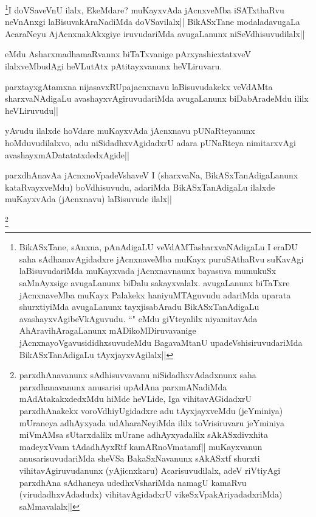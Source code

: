 \begin{artha}
\footnote{BikASxTane, sAnxna, pAnAdigaLU veVdAMTasharxvaNAdigaLu I eraDU saha sAdhanavAgidadxre jAcnxnaveMba muKayx puruSAthaRvu suKavAgi laBisuvudariMda muKayxvada jAcnxnavnaunx bayasuva mumukuSx saMnAyxsige avugaLanunx biDalu sakayxvalalx. avugaLanunx biTaTxre jAcnxnaveMba muKayx Palakekx haniyuMTAguvudu adariMda uparata shurxtiyiMda avugaLanunx tayxjisabAradu BikASxTanAdigaLu avashayxvAgibeVkAguvudu. ``\stext" eMdu giVteyalilx niyamitavAda AhAravihAragaLanunx mADikoMDiruvavanige jAcnxnayoVgavusididhxsuvudeMdu BagavaMtanU upadeVshisiruvudariMda BikASxTanAdigaLu tAyxjayxvAgilalx||}I doVSaveVnU ilalx, EkeMdare? muKayxvAda jAcnxveMba iSATxthaRvu neVnAnxgi laBisuvakAraNadiMda doVSavilalx|| BikASxTane modaladavugaLa AcaraNeyu AjAcnxnakAkxgiye iruvudariMda avugaLanunx niSeVdhisuvudilalx||
\end{artha}

\begin{artha}
eMdu AsharxmadhamaRvannx biTaTxvanige pArxyashicxtatxveV ilalxveMbudAgi heVLutAtx pAtitayxvanunx heVLiruvaru.
\end{artha}

\begin{artha}
parxtayxgAtamxna nijasavxRUpajacnxnavu laBisuvudakekx veVdAMta sharxvaNAdigaLu avashayxvAgiruvudariMda avugaLanunx biDabAradeMdu ililx heVLiruvudu||
\end{artha}


\begin{artha}
yAvudu ilalxde hoVdare muKayxvAda jAcnxnavu pUNaRteyanunx hoMduvudilalxvo, adu niSidadhxvAgidadxrU adara pUNaRteya nimitarxvAgi avashayxmADatatatxdedxAgide||
\end{artha}


\begin{artha}
parxdhAnavAa jAcnxnoVpadeVshaveV I (sharxvaNa, BikASxTanAdigaLanunx kataRvayxveMdu) boVdhisuvudu, adariMda BikASxTanAdigaLu  ilalxde muKayxvAda (jAcnxnavu) laBisuvude ilalx||
\end{artha}

\begin{artha}
\footnote{parxdhAnavanunx sAdhisuvvavanu niSidadhxvAdadxnunx saha parxdhanavanunx anusarisi upAdAna parxmANadiMda mAdAtakakxdedxMdu hiMde heVLide, Iga vihitavAGidadxrU parxdhAnakekx voroVdhiyUgidadxre adu tAyxjayxveMdu (jeYminiya) mUraneya adhAyxyada udAharaNeyiMda ililx toVrisiruvaru jeYminiya miVmAMsa sUtarxdalilx mUrane adhAyxyadalilx sAkASxdivxhita madeyxVvam tAdadhAyxRtf kamARnoVmatamf|| muKayxvanun anusarisuvudariMda sheVSa BakaSxNavanunx sAkASxtf shurxti vihitavAgiruvudanunx (yAjicnxkaru) Acarisuvudilalx, adeV riVtiyAgi parxdhAna sAdhaneya udedhxVshariMda namagU kamaRvu (virudadhxvAdadudx) vihitavAgidadxrU vikeSxVpakAriyadadxriMda) saMmavalalx||}
\end{artha}

